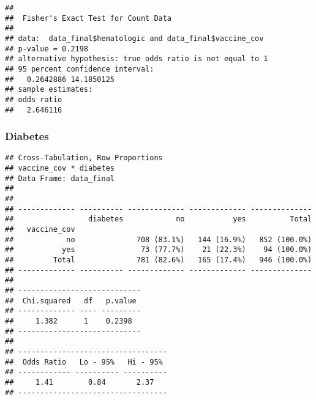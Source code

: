 \documentclass[
]{article}
\newenvironment{Shaded}{\begin{snugshade}}{\end{snugshade}}
\newcommand{\AttributeTok}[1]{\textcolor[rgb]{0.77,0.63,0.00}{#1}}
\newcommand{\ConstantTok}[1]{\textcolor[rgb]{0.00,0.00,0.00}{#1}}
\newcommand{\FunctionTok}[1]{\textcolor[rgb]{0.00,0.00,0.00}{#1}}
\newcommand{\NormalTok}[1]{#1}
\newcommand{\SpecialCharTok}[1]{\textcolor[rgb]{0.00,0.00,0.00}{#1}}
\newcommand{\StringTok}[1]{\textcolor[rgb]{0.31,0.60,0.02}{#1}}
\begin{document}
\begin{Shaded}
\end{Shaded}

\begin{verbatim}
## 
##  Fisher's Exact Test for Count Data
## 
## data:  data_final$hematologic and data_final$vaccine_cov
## p-value = 0.2198
## alternative hypothesis: true odds ratio is not equal to 1
## 95 percent confidence interval:
##   0.2642886 14.1850125
## sample estimates:
## odds ratio 
##   2.646116
\end{verbatim}

\hypertarget{diabetes}{%
\subsubsection{Diabetes}\label{diabetes}}

\begin{Shaded}
\end{Shaded}

\begin{verbatim}
## Cross-Tabulation, Row Proportions  
## vaccine_cov * diabetes  
## Data Frame: data_final  
## 
## 
## ------------- ---------- ------------- ------------- --------------
##                 diabetes            no           yes          Total
##   vaccine_cov                                                      
##            no              708 (83.1%)   144 (16.9%)   852 (100.0%)
##           yes               73 (77.7%)    21 (22.3%)    94 (100.0%)
##         Total              781 (82.6%)   165 (17.4%)   946 (100.0%)
## ------------- ---------- ------------- ------------- --------------
## 
## ----------------------------
##  Chi.squared   df   p.value 
## ------------- ---- ---------
##     1.382      1    0.2398  
## ----------------------------
## 
## ----------------------------------
##  Odds Ratio   Lo - 95%   Hi - 95% 
## ------------ ---------- ----------
##     1.41        0.84       2.37   
## ----------------------------------
\end{verbatim}
\end{document}
